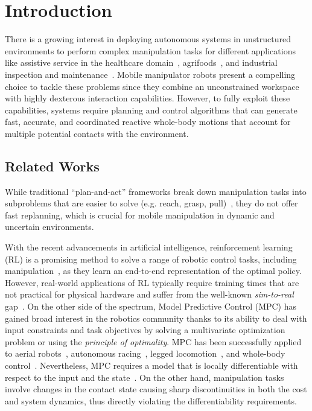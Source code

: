 \section{Introduction} \label{sec:introduction}
\showthe\font
There is a growing interest in deploying autonomous systems in unstructured environments to perform complex manipulation tasks for different applications like assistive service in the healthcare domain~\cite{cooper2020ari}, agrifoods~\cite{duckett2018agricultural}, and industrial inspection and maintenance~\cite{lattanzi2017review}. Mobile manipulator robots present a compelling choice to tackle these problems since they combine an unconstrained workspace with highly dexterous interaction capabilities. However, to fully exploit these capabilities, systems require planning and control algorithms that can generate fast, accurate, and coordinated reactive whole-body motions that account for multiple potential contacts with the environment. 

\subsection{Related Works}

While traditional ``plan-and-act'' frameworks break down manipulation tasks into subproblems that are easier to solve (e.g. reach, grasp, pull)~\cite{Murali2020}, they do not offer fast replanning, which is crucial for mobile manipulation in dynamic and uncertain environments.

With the recent advancements in artificial intelligence, reinforcement learning (RL) is a promising method to solve a range of robotic control tasks, including manipulation~\cite{finn2016deep}, as they learn an end-to-end representation of the optimal policy. However, real-world applications of RL typically require training times that are not practical for physical hardware and suffer from the well-known \textit{sim-to-real} gap~\cite{chebotar2019closing}. 
On the other side of the spectrum, Model Predictive Control (MPC) has gained broad interest in the robotics community thanks to its ability to deal with input constraints and task objectives by solving a multivariate optimization problem or using the \textit{principle of optimality}. 
MPC has been successfully applied to aerial robots~\cite{brunner2020trajectory}, autonomous racing~\cite{liniger2015optimization}, legged locomotion~\cite{grandia2019frequency}, and whole-body control~\cite{minniti2019whole}. 
Nevertheless, MPC requires a model that is locally differentiable with respect to the input and the state~\cite{buchli2017optimal}. On the other hand, manipulation tasks involve changes in the contact state causing sharp discontinuities in both the cost and system dynamics, thus directly violating the differentiability requirements. 


